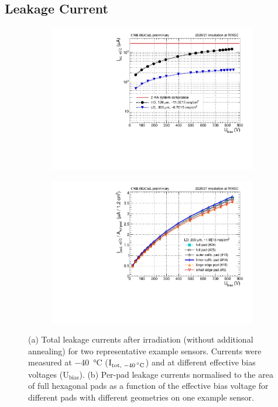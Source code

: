 \subsection{Leakage Current}
\label{subsec:leakagecurrents}
\begin{figure}
	\captionsetup[subfigure]{aboveskip=-1pt,belowskip=-1pt}
	\centering
	\begin{subfigure}[b]{0.49\textwidth}
		\includegraphics[width=0.999\textwidth]{plots/total_iv/total_current_IV.pdf}
		\subcaption{
		}
		\label{plot:tot_IV_good}
    \end{subfigure}
    \hfill
    \begin{subfigure}[b]{0.49\textwidth}
        \includegraphics[width=0.999\textwidth]{plots/channel_iv/channel_IV_sensors_channels.pdf}
        \subcaption{
        }
        \label{plot:pad_IV_channels}
    \end{subfigure}

	\caption{
		(a) Total leakage currents after irradiation (without additional annealing) for two representative example sensors. 
		Currents were measured at \SI{-40}{\celsius} ($\text{I}_\text{tot, \SI{-40}{\celsius}}$) and at different effective bias voltages ($\text{U}_\text{bias}$). 
        (b) Per-pad leakage currents normalised to the area of full hexagonal pads as a function of the effective bias voltage for different pads with different geometries on one example sensor.
	}
\end{figure}
